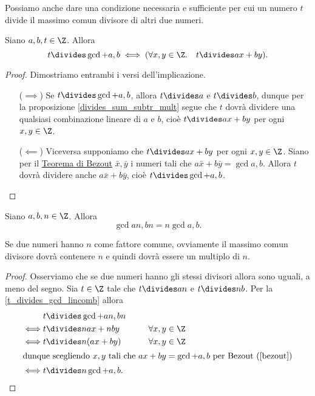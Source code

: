 Possiamo anche dare una condizione necessaria e sufficiente per cui un numero $t$ divide il massimo comun divisore di altri due numeri.

\begin{proposition} \label{t_divides_gcd_lincomb}
    Siano $a, b, t \in \Z$. Allora 
    \begin{equation}
        t \divides \gcd{a, b} \iff (\forall x, y \in \Z. \quad t \divides ax + by).
    \end{equation}
\end{proposition}
\begin{proof}
    Dimostriamo entrambi i versi dell'implicazione.
    \begin{itemize}
        \item[($\implies$)] Se $t \divides \gcd{a, b}$, allora $t \divides a$ e $t \divides b$, dunque per la proposizione \ref{divides_sum_subtr_mult} segue che $t$ dovrà dividere una qualsiasi combinazione lineare di $a$ e $b$, cioè $t \divides ax+by$ per ogni $x, y \in \Z$.
        \item[($\impliedby$)] Viceversa supponiamo che $t \divides ax+by$ per ogni $x, y \in \Z$. Siano per il \hyperref[bezout]{Teorema di Bezout} $\bar{x}, \bar{y}$ i numeri tali che $a\bar{x} + b\bar{y} = \gcd{a, b}$. Allora $t$ dovrà dividere anche $a\bar{x} + b\bar{y}$, cioè $t \divides \gcd{a, b}$. \qedhere
    \end{itemize}
\end{proof}

\begin{proposition} \label{gcd_of_multiples_of_n}
    Siano $a, b, n \in \Z$. Allora \begin{equation}
        \gcd{an, bn} = n\gcd{a, b}.
    \end{equation}
\end{proposition}
\begin{intuition}
    Se due numeri hanno $n$ come fattore comune, ovviamente il massimo comun divisore dovrà contenere $n$ e quindi dovrà essere un multiplo di $n$.
\end{intuition}
\begin{proof}
    Osserviamo che se due numeri hanno gli stessi divisori allora sono uguali, a meno del segno.
    Sia $t \in \Z$ tale che $t \divides an$ e $t \divides nb$. Per la \autoref{t_divides_gcd_lincomb} allora 
    \begin{alignat*}
        {2}
        &t \divides \gcd{an, bn}\\
        \iff &t \divides nax + nby      \qquad& \forall x, y \in \Z \\
        \iff &t \divides n(ax + by)     \qquad& \forall x, y \in \Z \\
        \intertext{dunque scegliendo $x, y$ tali che $ax+by = \gcd{a, b}$ per Bezout (\ref{bezout})}
        \iff &t \divides n\gcd{a, b}. \tag*{\qedhere}
    \end{alignat*}
\end{proof}


